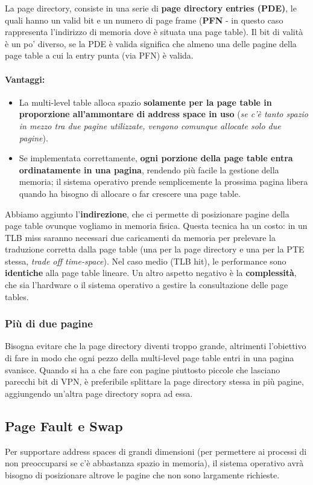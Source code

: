\documentclass[12pt, twoside, letterpaper]{article}
\begin{document}
				La page directory, consiste in una serie di \textbf{page directory entries (PDE)}, le quali hanno un valid bit e un numero di page frame (\textbf{PFN} - in questo caso rappresenta l'indirizzo di memoria dove è situata una page table). Il bit di valità è un po' diverso, se la PDE è valida significa che almeno una delle pagine della page table a cui la entry punta (via PFN) è valida. 
				\paragraph{Vantaggi:}
				\begin{itemize}
					\item La multi-level table alloca spazio \textbf{solamente per la page table in proporzione all'ammontare di address space in uso} (\textit{se c'è tanto spazio in mezzo tra due pagine utilizzate, vengono comunque allocate solo due pagine}). 
					\item Se implementata correttamente, \textbf{ogni porzione della page table entra ordinatamente in una pagina}, rendendo più facile la gestione della memoria; il sistema operativo prende semplicemente la prossima pagina libera quando ha bisogno di allocare o far crescere una page table.
				\end{itemize}
				Abbiamo aggiunto l'\textbf{indirezione}, che ci permette di posizionare pagine della page table ovunque vogliamo in memoria fisica. Questa tecnica ha un costo: in un TLB miss saranno necessari due caricamenti da memoria per prelevare la traduzione corretta dalla page table (una per la page directory e una per la PTE stessa, \textit{trade off time-space}). Nel caso medio (TLB hit), le performance sono \textbf{identiche }alla page table lineare. Un altro aspetto negativo è la \textbf{complessità}, che sia l'hardware o il sistema operativo a gestire la consultazione delle page tables.
			
			\subsubsection{Più di due pagine}
				Bisogna evitare che la page directory diventi troppo grande, altrimenti l'obiettivo di fare in modo che ogni pezzo della multi-level page table entri in una pagina svanisce. Quando si ha a che fare con pagine piuttosto piccole che lasciano parecchi bit di VPN, è preferibile splittare la page directory stessa in più pagine, aggiungendo un'altra page directory sopra ad essa. 
				
		\subsection{Page Fault e Swap}
			Per supportare address spaces di grandi dimensioni (per permettere ai processi di non preoccuparsi se c'è abbastanza spazio in memoria), il sistema operativo avrà bisogno di posizionare altrove le pagine che non sono largamente richieste.
			
\end{document}
